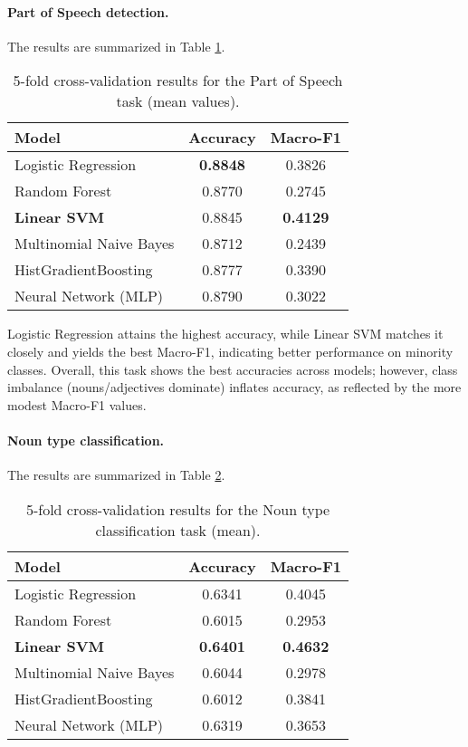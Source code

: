 \paragraph{Part of Speech detection.} The results are summarized in Table \ref{tab:pos-results}.
\begin{table}[h!]
\centering
\caption{5-fold cross-validation results for the Part of Speech task (mean values).}
\label{tab:pos-results}
\small
\renewcommand{\arraystretch}{1.1}
\begin{tabular}{|l|c|c|}
\hline
\textbf{Model} & \textbf{Accuracy} & \textbf{Macro-F1} \\
\hline
Logistic Regression      & \textbf{0.8848} & 0.3826 \\
Random Forest            & 0.8770          & 0.2745 \\
\textbf{Linear SVM}      & 0.8845          & \textbf{0.4129} \\
Multinomial Naive Bayes  & 0.8712          & 0.2439 \\
HistGradientBoosting     & 0.8777          & 0.3390 \\
Neural Network (MLP)     & 0.8790          & 0.3022 \\
\hline
\end{tabular}
\end{table}

Logistic Regression attains the highest accuracy, while Linear SVM matches it closely and yields the best Macro-F1, indicating better performance on minority classes.  
Overall, this task shows the best accuracies across models; however, class imbalance (nouns/adjectives dominate) inflates accuracy, as reflected by the more modest Macro-F1 values.

\paragraph{Noun type classification.} The results are summarized in Table \ref{table:noun-type-results}.
\begin{table}[h!]
\centering
\caption{5-fold cross-validation results for the Noun type classification task (mean).}
\label{table:noun-type-results}
\small
\renewcommand{\arraystretch}{1.1}
\begin{tabular}{|l|c|c|}
\hline
\textbf{Model} & \textbf{Accuracy} & \textbf{Macro-F1} \\
\hline
Logistic Regression      & 0.6341          & 0.4045 \\
Random Forest            & 0.6015          & 0.2953 \\
\textbf{Linear SVM}      & \textbf{0.6401} & \textbf{0.4632} \\
Multinomial Naive Bayes  & 0.6044          & 0.2978 \\
HistGradientBoosting     & 0.6012          & 0.3841 \\
Neural Network (MLP)     & 0.6319          & 0.3653 \\
\hline
\end{tabular}
\end{table}

